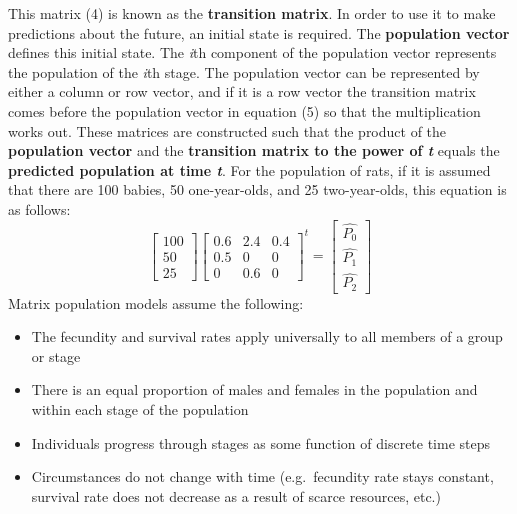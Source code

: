 \documentclass{article}
\begin{document}
    This matrix (4) is known as the \textbf{transition matrix}.
    In order to use it to make predictions about the future, an initial state is required.
    The \textbf{population vector} defines this initial state.
    The \textit{i}th component of the population vector represents the population of the \textit{i}th stage.
    The population vector can be represented by either a column or row vector, and if it is a row vector the transition matrix comes before the population vector in equation (5) so that the multiplication works out.
    These matrices are constructed such that the product of the \textbf{population vector} and the \textbf{transition matrix to the power of \textit{t}} equals the \textbf{predicted population at time \textit{t}}.
    For the population of rats, if it is assumed that there are 100 babies, 50 one-year-olds, and 25 two-year-olds, this equation is as follows:
    \begin{equation}
        \begin{bmatrix}
            100 \\
            50  \\
            25
        \end{bmatrix}
        \begin{bmatrix}
            0.6 & 2.4 & 0.4 \\
            0.5 & 0   & 0   \\
            0   & 0.6 & 0
        \end{bmatrix}^\textit{t}=
        \begin{bmatrix}
            \hat{P_0} \\
            \hat{P_1} \\
            \hat{P_2}
        \end{bmatrix}\label{eq:equation5}
    \end{equation}
    \noindent Matrix population models assume the following:
    \begin{itemize}
        \item The fecundity and survival rates apply universally to all members of a group or stage
        \item There is an equal proportion of males and females in the population and within each stage of the population
        \item Individuals progress through stages as some function of discrete time steps
        \item Circumstances do not change with time (e.g.\ fecundity rate stays constant, survival rate does not decrease as a result of scarce resources, etc.)
    \end{itemize}
\end{document}
